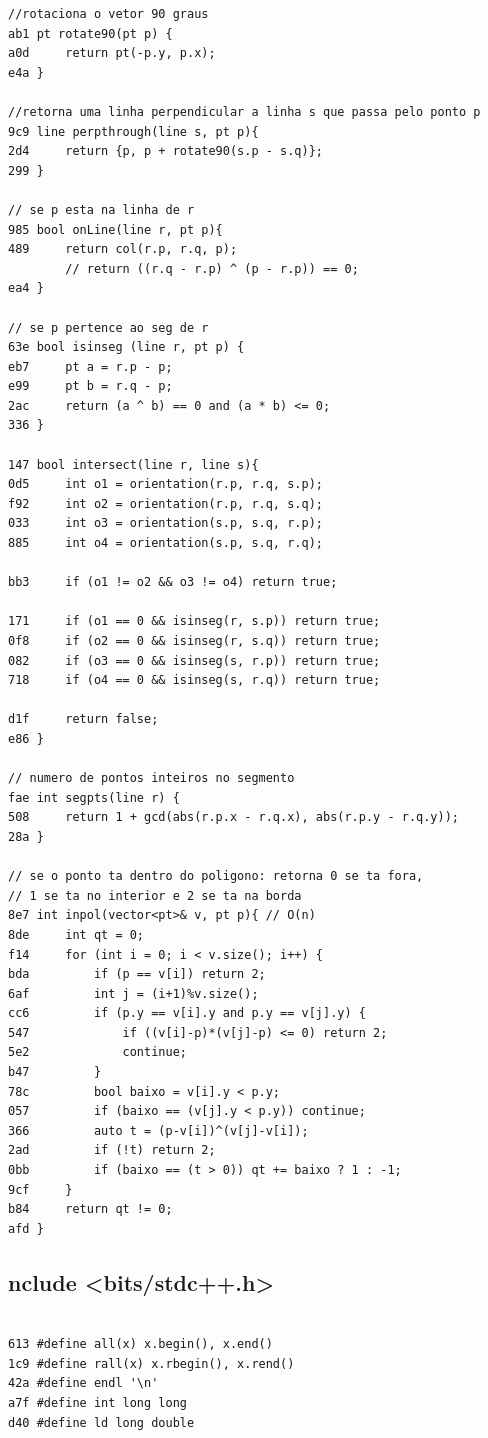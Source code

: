 \documentclass[11pt, a4paper, twoside]{article}
\begin{document}
{\begin{lstlisting}
//rotaciona o vetor 90 graus
ab1 pt rotate90(pt p) {
a0d 	return pt(-p.y, p.x);
e4a }

//retorna uma linha perpendicular a linha s que passa pelo ponto p
9c9 line perpthrough(line s, pt p){
2d4     return {p, p + rotate90(s.p - s.q)};
299 }

// se p esta na linha de r
985 bool onLine(line r, pt p){
489     return col(r.p, r.q, p);
        // return ((r.q - r.p) ^ (p - r.p)) == 0;
ea4 }

// se p pertence ao seg de r
63e bool isinseg (line r, pt p) {
eb7 	pt a = r.p - p;
e99     pt b = r.q - p;
2ac 	return (a ^ b) == 0 and (a * b) <= 0;
336 }

147 bool intersect(line r, line s){
0d5     int o1 = orientation(r.p, r.q, s.p);
f92     int o2 = orientation(r.p, r.q, s.q);
033     int o3 = orientation(s.p, s.q, r.p);
885     int o4 = orientation(s.p, s.q, r.q);
    
bb3     if (o1 != o2 && o3 != o4) return true;
    
171     if (o1 == 0 && isinseg(r, s.p)) return true;
0f8     if (o2 == 0 && isinseg(r, s.q)) return true;
082     if (o3 == 0 && isinseg(s, r.p)) return true;
718     if (o4 == 0 && isinseg(s, r.q)) return true;
    
d1f     return false;
e86 }

// numero de pontos inteiros no segmento
fae int segpts(line r) {
508 	return 1 + gcd(abs(r.p.x - r.q.x), abs(r.p.y - r.q.y));
28a }

// se o ponto ta dentro do poligono: retorna 0 se ta fora,
// 1 se ta no interior e 2 se ta na borda
8e7 int inpol(vector<pt>& v, pt p){ // O(n)
8de 	int qt = 0;
f14 	for (int i = 0; i < v.size(); i++) {
bda 		if (p == v[i]) return 2;
6af 		int j = (i+1)%v.size();
cc6 		if (p.y == v[i].y and p.y == v[j].y) {
547 			if ((v[i]-p)*(v[j]-p) <= 0) return 2;
5e2 			continue;
b47 		}
78c 		bool baixo = v[i].y < p.y;
057 		if (baixo == (v[j].y < p.y)) continue;
366 		auto t = (p-v[i])^(v[j]-v[i]);
2ad 		if (!t) return 2;
0bb 		if (baixo == (t > 0)) qt += baixo ? 1 : -1;
9cf 	}
b84 	return qt != 0;
afd }
\end{lstlisting}

\subsection{nclude <bits/stdc++.h>}
\begin{lstlisting}

613 #define all(x) x.begin(), x.end()
1c9 #define rall(x) x.rbegin(), x.rend()
42a #define endl '\n'
a7f #define int long long
d40 #define ld long double


\end{lstlisting}}
\end{document}
